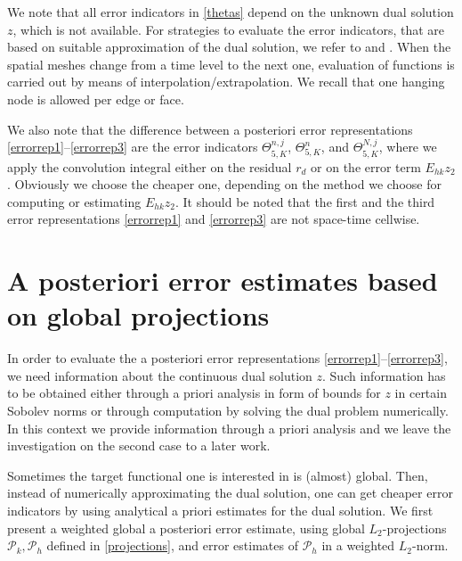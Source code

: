\documentclass{amsart}
\numberwithin{equation}{section}
\theoremstyle{definition}
\begin{document}
We note that all error indicators in \eqref{thetas} depend on  
the unknown dual solution $z$, which is not available. 
For strategies to evaluate the error indicators, 
that are based on suitable approximation of the dual solution, 
we refer to  \cite{BangerthGeigerRannacher} 
and \cite{BangerthRannacher:Book}. 
When the spatial meshes change from a time 
level to the next one, evaluation of functions is carried out by means 
of interpolation/extrapolation. We recall that one hanging node is allowed 
per edge or face. 

We also note that the difference between a posteriori error representations 
 \eqref{errorrep1}--\eqref{errorrep3} are the error indicators 
 $\Theta_{5,K}^{n,j}$, $\Theta_{5,K}^n$, and $\Theta_{5,K}^{N,j}$, 
 where we apply the convolution integral either on the residual 
 $r_d$ or on the error term $E_{hk}z_2$. 
 Obviously we choose the cheaper one, depending on the method 
 we choose for computing or estimating $E_{hk}z_2$. 
 It should be noted that the first and the third error representations 
 \eqref{errorrep1} and \eqref{errorrep3} 
 are not space-time cellwise.

\section{{\bf A posteriori error estimates based on global projections}}
In order to evaluate the a posteriori error representations 
\eqref{errorrep1}--\eqref{errorrep3}, 
we need information about the continuous dual solution $z$.
Such information has to be obtained either through a priori
analysis in form of bounds for $z$ in certain Sobolev norms or
through computation by solving the dual problem numerically.
In this context we provide information through a priori analysis
and we leave the investigation on the second case to a later work.

Sometimes the target functional one is interested in is (almost) 
global. Then, instead of numerically approximating the dual solution, 
one can get cheaper error indicators by using analytical a priori estimates for 
the dual solution. We first present a weighted global a posteriori error estimate,
using global $L_2$-projections ${\mathcal P}_k,{\mathcal P}_h$ defined in
\eqref{projections}, and error estimates of ${\mathcal P}_h$ in a
weighted $L_2$-norm.
\end{document}
